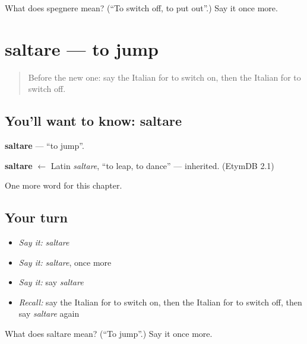 \begin{tcolorbox}[breakable,colback=teal!4,colframe=teal!35!black,title={Before you move on}]
What does spegnere mean? (\textquotedblleft{}To switch off, to put out\textquotedblright{}.) Say it once more.
\end{tcolorbox}
\section[saltare]{saltare — to jump}

\label{lesson:IT-C140-saltare}



\begin{quote}
Before the new one: say the Italian for to switch on, then the Italian for to switch off.
\end{quote}

\subsection*{You'll want to know: saltare}
\textbf{saltare} — \textquotedblleft{}to jump\textquotedblright{}.

\begin{cousinweb}
\textbf{saltare} $\leftarrow$ Latin \emph{saltare}, \textquotedblleft{}to leap, to dance\textquotedblright{} — inherited. (EtymDB 2.1)
\end{cousinweb}

\begin{grammarlens}[title={What you've built}]
One more word for this chapter.
\end{grammarlens}

\subsection*{Your turn}
\begin{itemize}
\raggedright
  \item \emph{Say it:} \emph{saltare}
  \item \emph{Say it:} \emph{saltare}, once more
  \item \emph{Say it:} say \emph{saltare}
  \item \emph{Recall:} say the Italian for to switch on, then the Italian for to switch off, then say \emph{saltare} again
\end{itemize}

\begin{tcolorbox}[breakable,colback=teal!4,colframe=teal!35!black,title={Before you move on}]
What does saltare mean? (\textquotedblleft{}To jump\textquotedblright{}.) Say it once more.
\end{tcolorbox}
